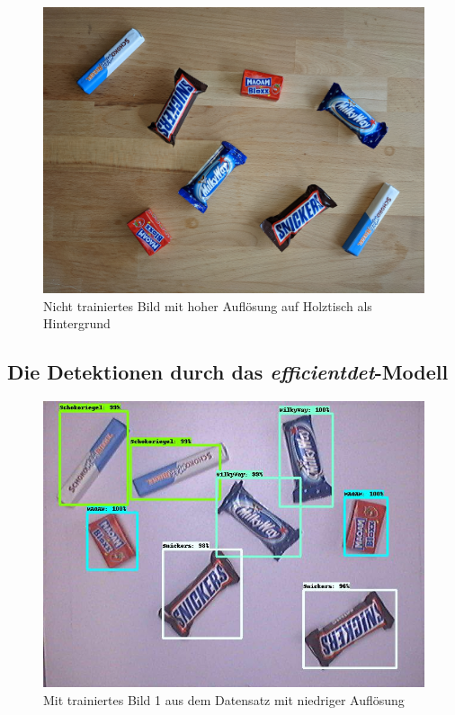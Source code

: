     \begin{figure}[H]
        \centering
        \includegraphics[angle = 90, width = \textwidth]{Bilder/models/model_comparison/images-to-detect/HD_on_wood.jpg}
        \caption{Nicht trainiertes Bild mit hoher Auflösung auf Holztisch als Hintergrund}
    \end{figure}
    
    
    \subsection{Die Detektionen durch das \textit{efficientdet}-Modell}
    
    \begin{figure}[H]
        \vspace{-5mm}
        \centering
        \includegraphics[angle = 90, height = 0.85\textheight]{Bilder/models/model_comparison/efficientdet_d1_coco17_tpu-32/trained_1.jpg}
        \caption{Mit trainiertes Bild 1 aus dem Datensatz mit niedriger Auflösung}
    \end{figure}
    
